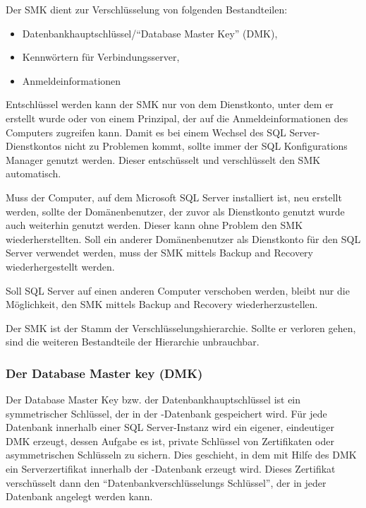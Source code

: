          Der SMK dient zur Verschlüsselung von folgenden Bestandteilen:
          \begin{itemize}
            \item {Datenbankhauptschlüssel}/\enquote{Database Master Key} (DMK),
            \item Kennwörtern für Verbindungsserver,
            \item Anmeldeinformationen 
          \end{itemize}
          Entschlüssel werden kann der SMK nur von dem Dienstkonto, unter dem
          er erstellt wurde oder von einem Prinzipal, der auf die
          Anmeldeinformationen des Computers zugreifen kann. Damit es bei
          einem Wechsel des SQL Server-Dienstkontos nicht zu Problemen kommt,
          sollte immer der SQL Konfigurations Manager genutzt werden. Dieser
          entschüsselt und verschlüsselt den SMK automatisch.
          
          Muss der Computer, auf dem Microsoft SQL Server installiert ist, neu
          erstellt werden, sollte der Domänenbenutzer, der zuvor als
          Dienstkonto genutzt wurde auch weiterhin genutzt werden. Dieser kann
          ohne Problem den SMK wiederherstellten. Soll ein anderer
          Domänenbenutzer als Dienstkonto für den SQL Server verwendet werden,
          muss der SMK mittels Backup and Recovery wiederhergestellt werden.
          
          Soll SQL Server auf einen anderen Computer verschoben werden, bleibt
          nur die Möglichkeit, den SMK mittels Backup and Recovery
          wiederherzustellen.
          \begin{merke}
            Der SMK ist der Stamm der Verschlüsselungshierarchie. Sollte er
            verloren gehen, sind die weiteren Bestandteile der Hierarchie
            unbrauchbar.
          \end{merke}
          \begin{literaturinternet}
            \item \cite{ms189060}
          \end{literaturinternet}
        \subsubsection{Der Database Master key (DMK)}
          Der Database Master Key bzw. der Datenbankhauptschlüssel ist ein
          symmetrischer Schlüssel, der in der -Datenbank
          gespeichert wird. Für jede Datenbank innerhalb einer SQL
          Server-Instanz wird ein eigener, eindeutiger DMK erzeugt, dessen
          Aufgabe es ist, private Schlüssel von Zertifikaten oder asymmetrischen
          Schlüsseln zu sichern. Dies geschieht, in dem mit Hilfe des DMK ein 
          Serverzertifikat innerhalb der -Datenbank erzeugt
          wird. Dieses Zertifikat verschüsselt dann den
          \enquote{Datenbankverschlüsselungs Schlüssel}, der in jeder Datenbank
          angelegt werden kann.
          \begin{literaturinternet}
            \item \cite{bb964742}
          \end{literaturinternet}
